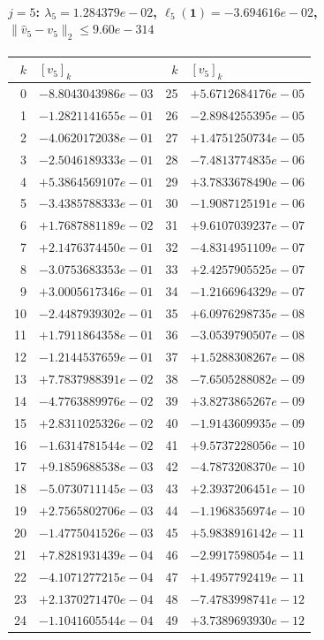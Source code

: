 \paragraph{$j = 5$: $\lambda_{5} = 1.284379e-02$, \quad $\ell_{5}(\mathbf{1}) = -3.694616e-02$, \quad $\|\hat{v}_{5} - v_{5}\|_2 \leq 9.60e-314$}
\begin{center}
{\footnotesize
\begin{tabular}{r@{\;\;}l@{\quad}r@{\;\;}l}
\toprule
$k$ & $[v_{5}]_k$ & $k$ & $[v_{5}]_k$ \\
\midrule
0 & $-8.8043043986e-03$ & 25 & $+5.6712684176e-05$ \\
1 & $-1.2821141655e-01$ & 26 & $-2.8984255395e-05$ \\
2 & $-4.0620172038e-01$ & 27 & $+1.4751250734e-05$ \\
3 & $-2.5046189333e-01$ & 28 & $-7.4813774835e-06$ \\
4 & $+5.3864569107e-01$ & 29 & $+3.7833678490e-06$ \\
5 & $-3.4385788333e-01$ & 30 & $-1.9087125191e-06$ \\
6 & $+1.7687881189e-02$ & 31 & $+9.6107039237e-07$ \\
7 & $+2.1476374450e-01$ & 32 & $-4.8314951109e-07$ \\
8 & $-3.0753683353e-01$ & 33 & $+2.4257905525e-07$ \\
9 & $+3.0005617346e-01$ & 34 & $-1.2166964329e-07$ \\
10 & $-2.4487939302e-01$ & 35 & $+6.0976298735e-08$ \\
11 & $+1.7911864358e-01$ & 36 & $-3.0539790507e-08$ \\
12 & $-1.2144537659e-01$ & 37 & $+1.5288308267e-08$ \\
13 & $+7.7837988391e-02$ & 38 & $-7.6505288082e-09$ \\
14 & $-4.7763889976e-02$ & 39 & $+3.8273865267e-09$ \\
15 & $+2.8311025326e-02$ & 40 & $-1.9143609935e-09$ \\
16 & $-1.6314781544e-02$ & 41 & $+9.5737228056e-10$ \\
17 & $+9.1859688538e-03$ & 42 & $-4.7873208370e-10$ \\
18 & $-5.0730711145e-03$ & 43 & $+2.3937206451e-10$ \\
19 & $+2.7565802706e-03$ & 44 & $-1.1968356974e-10$ \\
20 & $-1.4775041526e-03$ & 45 & $+5.9838916142e-11$ \\
21 & $+7.8281931439e-04$ & 46 & $-2.9917598054e-11$ \\
22 & $-4.1071277215e-04$ & 47 & $+1.4957792419e-11$ \\
23 & $+2.1370271470e-04$ & 48 & $-7.4783998741e-12$ \\
24 & $-1.1041605544e-04$ & 49 & $+3.7389693930e-12$ \\
\bottomrule
\end{tabular}
}
\end{center}

